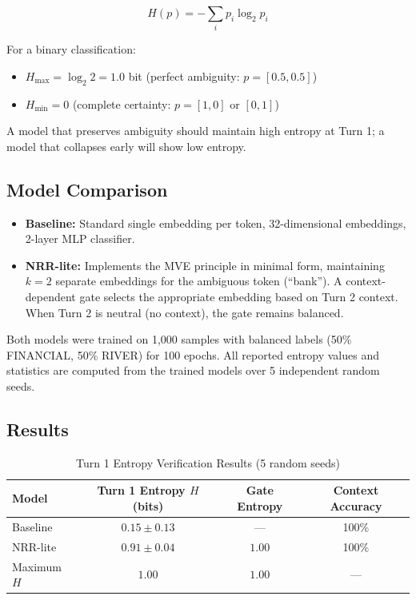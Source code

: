 \documentclass[11pt,a4paper]{article}
\begin{document}
\begin{equation}
H(p) = -\sum_{i} p_i \log_2 p_i
\end{equation}

For a binary classification:
\begin{itemize}
    \item $H_{\max} = \log_2 2 = 1.0$ bit (perfect ambiguity: $p = [0.5, 0.5]$)
    \item $H_{\min} = 0$ (complete certainty: $p = [1, 0]$ or $[0, 1]$)
\end{itemize}

A model that preserves ambiguity should maintain high entropy at Turn 1; a model that collapses early will show low entropy.

\subsection{Model Comparison}

\begin{itemize}
    \item \textbf{Baseline:} Standard single embedding per token, 32-dimensional embeddings, 2-layer MLP classifier.
    \item \textbf{NRR-lite:} Implements the MVE principle in minimal form, maintaining $k=2$ separate embeddings for the ambiguous token (``bank''). A context-dependent gate selects the appropriate embedding based on Turn 2 context. When Turn 2 is neutral (no context), the gate remains balanced.
\end{itemize}

Both models were trained on 1,000 samples with balanced labels (50\% FINANCIAL, 50\% RIVER) for 100 epochs.
All reported entropy values and statistics are computed from the trained models over 5 independent random seeds.

\subsection{Results}

\begin{table}[h]
\centering
\caption{Turn 1 Entropy Verification Results (5 random seeds)}
\label{tab:nrr_entropy}
\begin{tabular}{lccc}
\toprule
\textbf{Model} & \textbf{Turn 1 Entropy $H$ (bits)} & \textbf{Gate Entropy} & \textbf{Context Accuracy} \\
\midrule
Baseline       & $0.15 \pm 0.13$ & --- & 100\% \\
NRR-lite       & $\mathbf{0.91 \pm 0.04}$ & $1.00$ & 100\% \\
\midrule
Maximum $H$    & $1.00$ & $1.00$ & --- \\
\bottomrule
\end{tabular}
\end{table}
\end{document}
